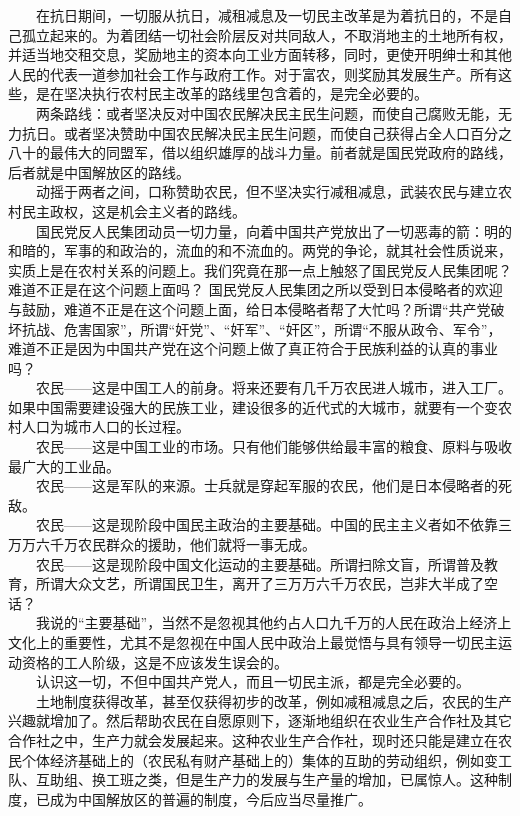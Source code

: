 \documentclass[cn,11pt,chinese]{elegantbook}
\begin{document}
　　在抗日期间，一切服从抗日，减租减息及一切民主改革是为着抗日的，不是自己孤立起来的。为着团结一切社会阶层反对共同敌人，不取消地主的土地所有权，并适当地交租交息，奖励地主的资本向工业方面转移，同时，更使开明绅士和其他人民的代表一道参加社会工作与政府工作。对于富农，则奖励其发展生产。所有这些，是在坚决执行农村民主改革的路线里包含着的，是完全必要的。\\
　　两条路线：或者坚决反对中国农民解决民主民生问题，而使自己腐败无能，无力抗日。或者坚决赞助中国农民解决民主民生问题，而使自己获得占全人口百分之八十的最伟大的同盟军，借以组织雄厚的战斗力量。前者就是国民党政府的路线，后者就是中国解放区的路线。\\
　　动摇于两者之间，口称赞助农民，但不坚决实行减租减息，武装农民与建立农村民主政权，这是机会主义者的路线。\\
　　国民党反人民集团动员一切力量，向着中国共产党放出了一切恶毒的箭：明的和暗的，军事的和政治的，流血的和不流血的。两党的争论，就其社会性质说来，实质上是在农村关系的问题上。我们究竟在那一点上触怒了国民党反人民集团呢？难道不正是在这个问题上面吗？ 国民党反人民集团之所以受到日本侵略者的欢迎与鼓励，难道不正是在这个问题上面，给日本侵略者帮了大忙吗？所谓“共产党破坏抗战、危害国家”，所谓“奸党”、“奸军”、“奸区”，所谓“不服从政令、军令”，难道不正是因为中国共产党在这个问题上做了真正符合于民族利益的认真的事业吗？\\
　　农民——这是中国工人的前身。将来还要有几千万农民进人城市，进入工厂。如果中国需要建设强大的民族工业，建设很多的近代式的大城市，就要有一个变农村人口为城市人口的长过程。\\
　　农民——这是中国工业的市场。只有他们能够供给最丰富的粮食、原料与吸收最广大的工业品。\\
　　农民——这是军队的来源。士兵就是穿起军服的农民，他们是日本侵略者的死敌。\\
　　农民——这是现阶段中国民主政治的主要基础。中国的民主主义者如不依靠三万万六千万农民群众的援助，他们就将一事无成。\\
　　农民——这是现阶段中国文化运动的主要基础。所谓扫除文盲，所谓普及教育，所谓大众文艺，所谓国民卫生，离开了三万万六千万农民，岂非大半成了空话？\\
　　我说的“主要基础”，当然不是忽视其他约占人口九千万的人民在政治上经济上文化上的重要性，尤其不是忽视在中国人民中政治上最觉悟与具有领导一切民主运动资格的工人阶级，这是不应该发生误会的。\\
　　认识这一切，不但中国共产党人，而且一切民主派，都是完全必要的。\\
　　土地制度获得改革，甚至仅获得初步的改革，例如减租减息之后，农民的生产兴趣就增加了。然后帮助农民在自愿原则下，逐渐地组织在农业生产合作社及其它合作社之中，生产力就会发展起来。这种农业生产合作社，现时还只能是建立在农民个体经济基础上的（农民私有财产基础上的）集体的互助的劳动组织，例如变工队、互助组、换工班之类，但是生产力的发展与生产量的增加，已属惊人。这种制度，已成为中国解放区的普遍的制度，今后应当尽量推广。\\
\end{document}
